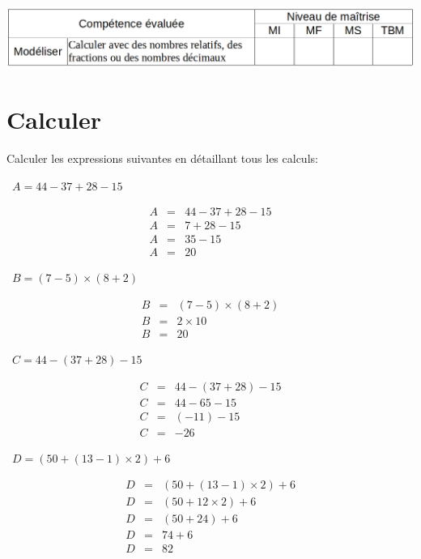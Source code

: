 	\includegraphics[scale=0.4]{competences}

\section{Calculer}
Calculer les expressions suivantes en détaillant tous les calculs:
\begin{questions}
	
	
	\question[3]  $A = 44 - 37 + 28 - 15$
	
	\fillwithdottedlines{6cm}
	{\LARGE \begin{solution}
		\begin{eqnarray*}
		A &=& 44 - 37 + 28 - 15 \\
		A &=& 7 + 28 - 15 \\
		A &=& 35 -15 \\
		A &=& 20
		\end{eqnarray*}
	\end{solution}}
	
	
	
\question[3]  $B = (7 - 5) \times (8 + 2)$
	
	\fillwithdottedlines{6cm}
	{\LARGE \begin{solution}
		\begin{eqnarray*}
		B &=& (7 - 5) \times (8 + 2)\\
		B &=& 2 \times 10 \\			
		B &=& 20
		\end{eqnarray*}
	\end{solution}}
	
	\newpage
	 \question[4]  $C = 44 - (37 + 28) - 15$
	
	\fillwithdottedlines{5cm}
	{\LARGE \begin{solution}
		\begin{eqnarray*}
		C &=&  44 - (37 + 28) - 15\\
		C &=&  44 - 65 - 15\\
		C &=& (- 11) - 15\\
		C &=& - 26
		\end{eqnarray*}
	\end{solution}
	}
	
	
	\question[4]  $D = (50 + (13 - 1) \times 2) + 6$
	
	\fillwithdottedlines{5cm}
	{\LARGE \begin{solution}
		\begin{eqnarray*}
		D &=&  (50 + (13 - 1) \times 2) + 6\\
		D &=&  (50 + 12 \times 2) + 6\\
		D &=& (50 + 24) + 6\\
		D &=& 74 + 6 \\
		D &=& 82 
		\end{eqnarray*}
	\end{solution}}
	

\end{questions}
